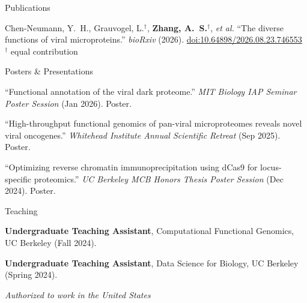 \documentclass[letterpaper]{resume} %
\begin{document}
\begin{rSection2}{Publications}
\item Chen-Neumann, Y.~H., Grauvogel, L.$^\dagger$, \textbf{Zhang, A.~S.}$^\dagger$, \textit{et al.} ``The diverse functions of viral microproteins.'' \textit{bioRxiv} (2026). \href{https://doi.org/10.64898/2026.08.23.746553}{doi:10.64898/2026.08.23.746553}\\
{\small\color{notiongray}$^\dagger$ equal contribution}
\end{rSection2}


\begin{rSection2}{Posters \& Presentations}
\item ``Functional annotation of the viral dark proteome.'' \textit{MIT Biology IAP Seminar Poster Session} (Jan 2026). Poster.
\item ``High-throughput functional genomics of pan-viral microproteomes reveals novel viral oncogenes.'' \textit{Whitehead Institute Annual Scientific Retreat} (Sep 2025). Poster.
\item ``Optimizing reverse chromatin immunoprecipitation using dCas9 for locus-specific proteomics.'' \textit{UC Berkeley MCB Honors Thesis Poster Session} (Dec 2024). Poster.
\end{rSection2}


\begin{rSection2}{Teaching}
\item \textbf{Undergraduate Teaching Assistant}, Computational Functional Genomics, UC Berkeley (Fall 2024).
\item \textbf{Undergraduate Teaching Assistant}, Data Science for Biology, UC Berkeley (Spring 2024).
\end{rSection2}


\begin{center}
\vspace{0.15cm}
\textit{Authorized to work in the United States}
\end{center}
\end{document}
